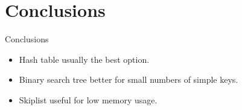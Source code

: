 \documentclass[10pt]{beamer}
\begin{document}
\section{Conclusions}

\begin{frame}{Conclusions}
    \begin{itemize}
        \item Hash table usually the best option.
        \item Binary search tree better for small numbers of simple keys.
        \item Skiplist useful for low memory usage.
    \end{itemize}
\end{frame}
\end{document}
